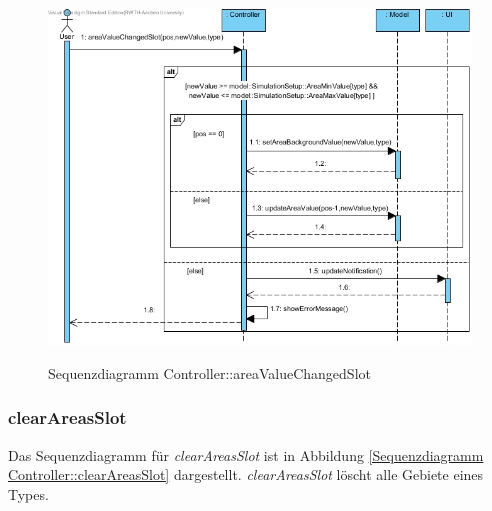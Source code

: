 \begin{figure}[H]
	\centering
	\includegraphics[scale=.5]{Bilder/Controller__areaValueChangedSlot().jpg}\\
	\caption{Sequenzdiagramm Controller::areaValueChangedSlot}
	\label{Sequenzdiagramm Controller::areaValueChangedSlot}
\end{figure}

\subsubsection*{clearAreasSlot}

Das Sequenzdiagramm für \emph{clearAreasSlot} ist in Abbildung \ref{Sequenzdiagramm Controller::clearAreasSlot} dargestellt. \emph{clearAreasSlot} löscht alle Gebiete eines Types.

